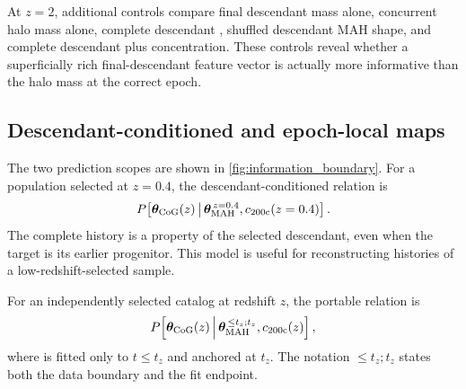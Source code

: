 At $z=2$, additional controls compare final descendant mass alone, concurrent
halo mass alone, complete descendant \diffmah{}, shuffled descendant MAH shape,
and complete descendant \diffmah{} plus concentration. These controls reveal
whether a superficially rich final-descendant feature vector is actually more
informative than the halo mass at the correct epoch.

\subsection{Descendant-conditioned and epoch-local maps}
\label{sec:two_scopes}

The two prediction scopes are shown in \cref{fig:information_boundary}. For a
population selected at $z=0.4$, the descendant-conditioned relation is
\begin{equation}
  P\!\left[\bm{\theta}_{\mathrm{CoG}}(z)\,\middle|\,
  \bm{\theta}_{\rm MAH}^{\,z=0.4},c_{200\mathrm{c}}(z=0.4)\right].
  \label{eq:descendant_map}
\end{equation}
The complete history is a property of the selected descendant, even when the
target is its earlier progenitor. This model is useful for reconstructing
histories of a low-redshift-selected sample.

For an independently selected catalog at redshift $z$, the portable relation is
\begin{equation}
  P\!\left[\bm{\theta}_{\mathrm{CoG}}(z)\,\middle|\,
  \bm{\theta}_{\rm MAH}^{\,\leq t_z;t_z},c_{200\mathrm{c}}(z)\right],
  \label{eq:local_map}
\end{equation}
where \diffmah{} is fitted only to $t\leq t_z$ and anchored at $t_z$. The
notation $\leq t_z;t_z$ states both the data boundary and the fit endpoint.

